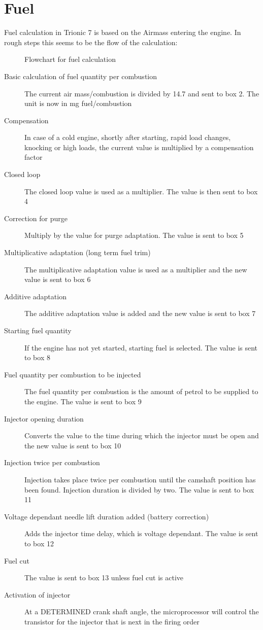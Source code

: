 \documentclass[11pt,a4paper]{book}
\begin{document}
\section{Fuel}
Fuel calculation in Trionic 7 is based on the Airmass entering the engine. In rough steps this seems to
be the flow of the calculation:

\begin{figure}[<+htpb+>]
    \centering
    
    \caption{Flowchart for fuel calculation}
    \label{fig:}
\end{figure}

\begin{description}
    \item[Basic calculation of fuel quantity per combustion] The current air mass/combustion is divided by 14.7
        and sent to box 2. The unit is now in mg
        fuel/combustion
    \item[Compensation] In case of a cold engine, shortly after starting, rapid
        load changes, knocking or high loads, the current
        value is multiplied by a compensation factor
    \item [Closed loop] The closed loop value is used as a multiplier. The
        value is then sent to box 4
    \item[Correction for purge] Multiply by the value for purge adaptation. The
        value is sent to box 5
    \item[Multiplicative adaptation (long term fuel trim)] The multiplicative adaptation value is used as a
        multiplier and the new value is sent to box 6
    \item[Additive adaptation] The additive adaptation value is added and the new
        value is sent to box 7
    \item[Starting fuel quantity] If the engine has not yet started, starting fuel is
        selected. The value is sent to box 8
    \item[Fuel quantity per combustion to be injected] The fuel quantity per combustion is the amount of
        petrol to be supplied to the engine. The value is sent
        to box 9
    \item[Injector opening duration] Converts the value to the time during which the
        injector must be open and the new value is sent to
        box 10
    \item[Injection twice per combustion] Injection takes place twice per combustion until the
        camshaft position has been found. Injection duration
        is divided by two. The value is sent to box 11
    \item[Voltage dependant needle lift duration added
        (battery correction)]
        Adds the injector time delay, which is voltage
        dependant. The value is sent to box 12
    \item[ Fuel cut] The value is sent to box 13 unless fuel cut is active
    \item[ Activation of injector] At a DETERMINED crank shaft angle, the
        microprocessor will control the transistor for the
        injector that is next in the firing order
\end{description}
\end{document}
